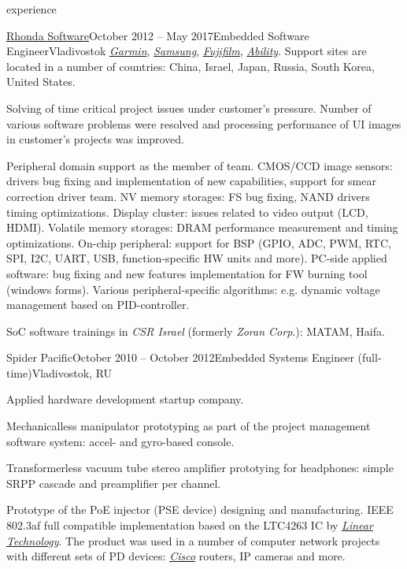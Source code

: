 \documentclass{template}
\begin{document}
\begin{rSection}{experience}
\begin{rCompany}{\href{http://www.rhondasoftware.com}{Rhonda Software}}{October 2012 -- May 2017}{Embedded Software Engineer}{Vladivostok}
      \href{http://www.garmin.com}{\textit{Garmin}}, \href{http://www.samsung.com}{\textit{Samsung}}, \href{http://www.fujifilm.com}{\textit{Fujifilm}},
      \href{http://www.abilitycorp.com.tw}{\textit{Ability}}. Support sites are located in a number of countries: China, Israel, Japan, Russia,
      South Korea, United States.
\item Solving of time critical project issues under customer's pressure. Number of various  software problems were resolved
      and processing performance of UI images in customer's projects was improved.
\item Peripheral domain support as the member of team. CMOS/CCD image sensors: drivers bug fixing and implementation of new capabilities, support
      for smear correction driver team. NV memory storages: FS bug fixing, NAND drivers timing optimizations. Display cluster: issues
      related to video output (LCD, HDMI). Volatile memory storages: DRAM performance measurement and timing optimizations. On-chip peripheral:
      support for BSP (GPIO, ADC, PWM, RTC, SPI, I2C, UART, USB, function-specific HW units and more). PC-side applied software: bug
      fixing and new features implementation for FW burning tool (windows forms). Various peripheral-specific algorithms: e.g. dynamic
      voltage management based on PID-controller.
\item SoC software trainings in \textit{CSR Israel} (formerly \textit{Zoran Corp}.): MATAM, Haifa.

\end{rCompany}
\begin{rCompany}{Spider Pacific}{October 2010 -- October 2012}{Embedded Systems Engineer (full-time)}{Vladivostok, RU}

\item Applied hardware development startup company.
\item Mechanicalless manipulator prototyping as part of the project management software system: accel- and gyro-based console.
\item Transformerless vacuum tube stereo amplifier prototying for headphones: simple SRPP cascade and preamplifier per channel.
\item Prototype of the PoE injector (PSE device) designing and manufacturing. IEEE 802.3af full compatible implementation based on the LTC4263 IC by
      \href{http://www.linear.com}{\textit{Linear Technology}}. The product was used in a number of computer network projects with different
      sets of PD devices: \href{http://www.cisco.com}{\textit{Cisco}} routers, IP cameras and more.

\end{rCompany}
\end{rSection}
\end{document}
